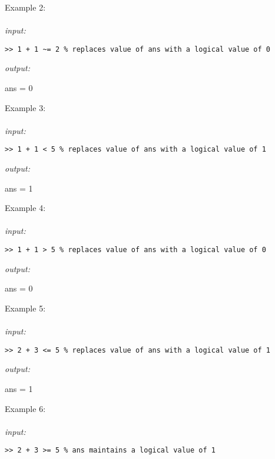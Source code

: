 \documentclass[../MATLAB_Primer.tex]{subfiles}
\begin{document}
Example 2:
\\ \\
\textit{input:}
\begin{lstlisting}[frame=single]
>> 1 + 1 ~= 2 % replaces value of ans with a logical value of 0
\end{lstlisting}

\textit{output:}

\begin{center}
    ans = 0
\end{center}

Example 3:
\\ \\
\textit{input:}
\begin{lstlisting}[frame=single]
>> 1 + 1 < 5 % replaces value of ans with a logical value of 1
\end{lstlisting}

\textit{output:}

\begin{center}
    ans = 1
\end{center}

Example 4:
\\ \\
\textit{input:}
\begin{lstlisting}[frame=single]
>> 1 + 1 > 5 % replaces value of ans with a logical value of 0
\end{lstlisting}

\textit{output:}

\begin{center}
    ans = 0
\end{center}

Example 5:
\\ \\
\textit{input:}
\begin{lstlisting}[frame=single]
>> 2 + 3 <= 5 % replaces value of ans with a logical value of 1
\end{lstlisting}

\textit{output:}

\begin{center}
    ans = 1
\end{center}

Example 6:
\\ \\
\textit{input:}
\begin{lstlisting}[frame=single]
>> 2 + 3 >= 5 % ans maintains a logical value of 1
\end{lstlisting}
\end{document}
